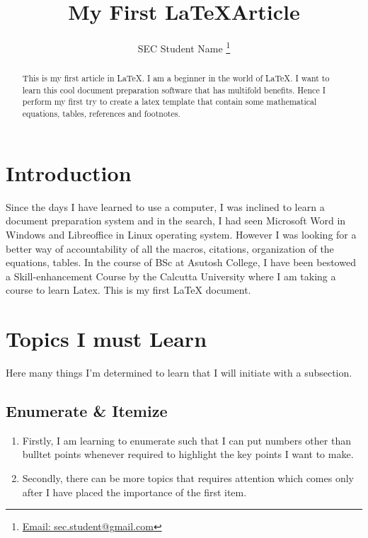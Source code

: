 \documentclass[onecolumn,12pt]{article}
\title{\bf My First \LaTeX Article}
\author{SEC Student Name \thanks{\href{mailto:sec.student@gmail.com}{Email: sec.student@gmail.com}}}
\affil{Department of Physics, Asutosh College, Kolkata 700026, India}
\begin{document}
\flushbottom
\maketitle
\thispagestyle{empty}

\begin{abstract}
This is my first article in \LaTeX. I am a beginner in the world of \LaTeX.
I want to learn this cool document preparation software that has multifold benefits. Hence I perform my first try to create a latex template that contain some mathematical equations, tables, references and footnotes.  
\end{abstract}

\section{Introduction}
\label{intro}
Since the days I have learned to use a computer, I was inclined to learn a document preparation system and in the search, I had seen Microsoft Word in Windows and Libreoffice in Linux operating system. However I was looking for a better way of accountability of all the macros, citations, organization of the equations, tables. In the course of BSc at Asutosh College, I have been bestowed a Skill-enhancement Course by the Calcutta University where I am taking a course to learn Latex. This is my first LaTeX\cite{leslam} document. 

\section{Topics I must Learn}
\label{sec:1}
Here many things I'm determined to learn that I will initiate with a subsection.
\subsection{Enumerate \& Itemize}
\begin{enumerate}
\item Firstly, I am learning to enumerate such that I can put numbers other than bulltet points whenever required to highlight the key points I want to make. 
\item Secondly, there can be more topics that requires attention which comes only after I have placed the importance of the first item.
\end{enumerate}
\end{document}
